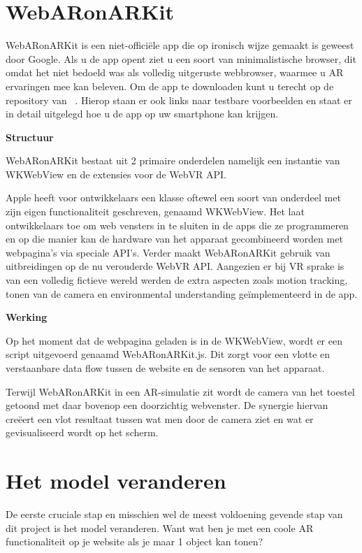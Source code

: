 \section{WebARonARKit}
\label{sec:WebARonARKit}

WebARonARKit is een niet-officiële app die op ironisch wijze gemaakt is geweest door Google. Als u de app opent ziet u een soort van minimalistische browser, dit omdat het niet bedoeld was als volledig uitgeruste webbrowser, waarmee u AR ervaringen mee kan beleven. Om de app te downloaden kunt u terecht op de repository van ~\textcite{Google2018}. Hierop staan er ook links naar testbare voorbeelden en staat er in detail uitgelegd hoe u de app op uw smartphone kan krijgen. 

\textbf{Structuur}

WebARonARKit bestaat uit 2 primaire onderdelen namelijk een instantie van WKWebView en de extensies voor de WebVR API. 

Apple heeft voor ontwikkelaars een klasse oftewel een soort van onderdeel met zijn eigen functionaliteit geschreven, genaamd WKWebView. Het laat ontwikkelaars toe om web vensters in te sluiten in de apps die ze programmeren en op die manier kan de hardware van het apparaat gecombineerd worden met webpagina's via speciale API's. 
Verder maakt WebARonARKit gebruik van uitbreidingen op de nu verouderde WebVR API. Aangezien er bij VR sprake is van een volledig fictieve wereld werden de extra aspecten zoals motion tracking, tonen van de camera en environmental understanding geïmplementeerd in de app. 

\textbf{Werking}

Op het moment dat de webpagina geladen is in de WKWebView, wordt er een script uitgevoerd genaamd WebARonARKit.js. Dit zorgt voor een vlotte en verstaanbare data flow tussen de website en de sensoren van het apparaat. 

Terwijl WebARonARKit in een AR-simulatie zit wordt de camera van het toestel getoond met daar bovenop een doorzichtig webvenster. De synergie hiervan creëert een vlot resultaat tussen wat men door de camera ziet en wat er gevisualiseerd wordt op het scherm. 

\section{Het model veranderen}
\label{sec:het-model-veranderen}

De eerste cruciale stap en misschien wel de meest voldoening gevende stap van dit project is het model veranderen. Want wat ben je met een coole AR functionaliteit op je website als je maar 1 object kan tonen?


